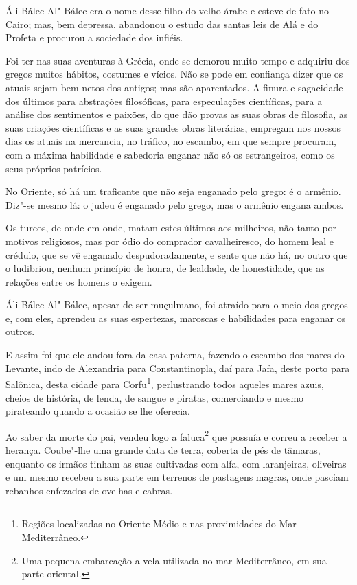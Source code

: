 Áli Bálec Al"-Bálec era o nome desse filho do velho árabe e esteve de
fato no Cairo; mas, bem depressa, abandonou o estudo das santas leis de
Alá e do Profeta e procurou a sociedade dos infiéis.

Foi ter nas suas aventuras à Grécia, onde se demorou muito tempo e
adquiriu dos gregos muitos hábitos, costumes e vícios. Não se pode em
confiança dizer que os atuais sejam bem netos dos antigos; mas são
aparentados. A finura e sagacidade dos últimos para abstrações
filosóficas, para especulações científicas, para a análise dos
sentimentos e paixões, do que dão provas as suas obras de filosofia, as
suas criações científicas e as suas grandes obras literárias, empregam
nos nossos dias os atuais na mercancia, no tráfico, no escambo, em que
sempre procuram, com a máxima habilidade e sabedoria enganar não só os
estrangeiros, como os seus próprios patrícios.

No Oriente, só há um traficante que não seja enganado pelo grego: é o
armênio. Diz"-se mesmo lá: o judeu é enganado pelo grego, mas o armênio
engana ambos.

Os turcos, de onde em onde, matam estes últimos aos milheiros, não tanto
por motivos religiosos, mas por ódio do comprador cavalheiresco, do
homem leal e crédulo, que se vê enganado despudoradamente, e sente que
não há, no outro que o ludibriou, nenhum princípio de honra, de
lealdade, de honestidade, que as relações entre os homens o exigem.

Áli Bálec Al"-Bálec, apesar de ser muçulmano, foi atraído para o meio dos
gregos e, com eles, aprendeu as suas espertezas, maroscas e habilidades
para enganar os outros.

E assim foi que ele andou fora da casa paterna, fazendo o escambo dos
mares do Levante, indo de Alexandria para Constantinopla, daí para Jafa,
deste porto para Salônica, desta cidade para Corfu\footnote{Regiões
  localizadas no Oriente Médio e nas proximidades do Mar Mediterrâneo.},
perlustrando todos aqueles mares azuis, cheios de história, de lenda, de
sangue e piratas, comerciando e mesmo pirateando quando a ocasião se lhe
oferecia.

Ao saber da morte do pai, vendeu logo a faluca\footnote{Uma pequena
  embarcação a vela utilizada no mar Mediterrâneo, em sua parte
  oriental.} que possuía e correu a receber a herança. Coube"-lhe uma
grande data de terra, coberta de pés de tâmaras, enquanto os irmãos
tinham as suas cultivadas com alfa, com laranjeiras, oliveiras e um
mesmo recebeu a sua parte em terrenos de pastagens magras, onde pasciam
rebanhos enfezados de ovelhas e cabras.


